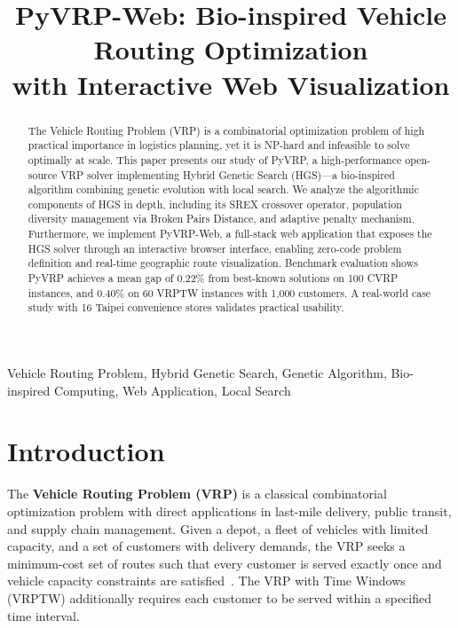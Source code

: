 \documentclass[conference]{IEEEtran}
\begin{document}
\title{PyVRP-Web: Bio-inspired Vehicle Routing Optimization\\
with Interactive Web Visualization}

\author{
}

\maketitle

\begin{abstract}
The Vehicle Routing Problem (VRP) is a combinatorial optimization problem
of high practical importance in logistics planning, yet it is NP-hard and
infeasible to solve optimally at scale. This paper presents our study of
PyVRP, a high-performance open-source VRP solver implementing Hybrid Genetic
Search (HGS)---a bio-inspired algorithm combining genetic evolution with
local search. We analyze the algorithmic components of HGS in depth,
including its SREX crossover operator, population diversity management via
Broken Pairs Distance, and adaptive penalty mechanism. Furthermore, we
implement PyVRP-Web, a full-stack web application that exposes the HGS
solver through an interactive browser interface, enabling zero-code problem
definition and real-time geographic route visualization. Benchmark evaluation
shows PyVRP achieves a mean gap of 0.22\% from best-known solutions on 100
CVRP instances, and 0.40\% on 60 VRPTW instances with 1,000 customers. A
real-world case study with 16 Taipei convenience stores validates practical
usability.
\end{abstract}

\begin{IEEEkeywords}
Vehicle Routing Problem, Hybrid Genetic Search, Genetic Algorithm,
Bio-inspired Computing, Web Application, Local Search
\end{IEEEkeywords}

\section{Introduction}\label{sec:intro}

The \textbf{Vehicle Routing Problem (VRP)} is a classical combinatorial
optimization problem with direct applications in last-mile delivery, public
transit, and supply chain management. Given a depot, a fleet of vehicles
with limited capacity, and a set of customers with delivery demands, the VRP
seeks a minimum-cost set of routes such that every customer is served exactly
once and vehicle capacity constraints are satisfied~\cite{toth2014vehicle}.
The VRP with Time Windows (VRPTW) additionally requires each customer to be
served within a specified time interval.
\end{document}
